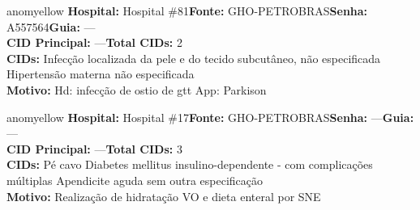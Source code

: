 \documentclass[a4paper,10pt]{article}
\begin{document}
\begin{anomalycard}[Interna\c{c}\~{a}o \#167227 | Pac. \#90713 | MODERADO (z=2.61) | LOS: 23d | 28/02/2026\,$\to$\,—]{anomyellow}
\textbf{Hospital:} Hospital \#81\quad \textbf{Fonte:} GHO-PETROBRAS\quad \textbf{Senha:} A557564\quad \textbf{Guia:} ---\\

\textbf{CID Principal:} {\small ---}\quad\textbf{Total CIDs:} 2\\

\textbf{CIDs:} {\scriptsize Infecção localizada da pele e do tecido subcutâneo, não especificada \textbar{} Hipertensão materna não especificada}\\

\textbf{Motivo:} {\scriptsize Hd: infecção de ostio de gtt  App: Parkison}\\



\end{anomalycard}


\begin{anomalycard}[Interna\c{c}\~{a}o \#167765 | Pac. \#81877 | MODERADO (z=2.48) | LOS: 18d | 05/03/2026\,$\to$\,—]{anomyellow}
\textbf{Hospital:} Hospital \#17\quad \textbf{Fonte:} GHO-PETROBRAS\quad \textbf{Senha:} ---\quad \textbf{Guia:} ---\\

\textbf{CID Principal:} {\small ---}\quad\textbf{Total CIDs:} 3\\

\textbf{CIDs:} {\scriptsize Pé cavo \textbar{} Diabetes mellitus insulino-dependente - com complicações múltiplas \textbar{} Apendicite aguda sem outra especificação}\\

\textbf{Motivo:} {\scriptsize Realização  de hidratação VO e dieta enteral por SNE}\\



\end{anomalycard}
\end{document}
